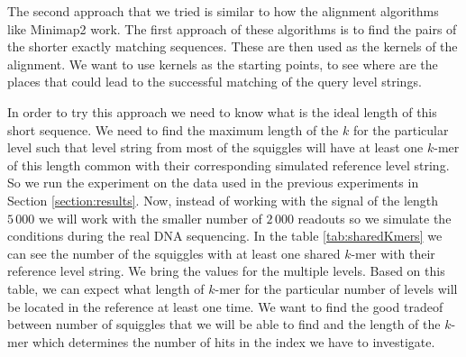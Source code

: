 The second approach that we tried is similar to how the alignment algorithms like
Minimap2 work. The first approach of these algorithms is to find the pairs of the shorter
exactly matching sequences. These are then used as the kernels of the alignment. We want
to use kernels as the starting points, to see where are the places that could lead to the
successful matching of the query level strings.

In order to try this approach we need to know what is the ideal length of this short
sequence. We need to find the maximum length of the $k$ for the particular level
such that level string from most of the squiggles will have at least one $k$-mer
of this length common with their corresponding simulated reference level string.
So we run the experiment on the data used in the previous experiments in Section
\ref{section:results}. Now, instead of working with the signal of the length
$5\,000$ we will work with the smaller number of $2\,000$ readouts so we
simulate the conditions during the real DNA sequencing. In the table \ref{tab:sharedKmers}
we can see the number of the squiggles with at least one shared $k$-mer with their reference
level string. We bring the values for the multiple levels. Based on this table,
we can expect what length of $k$-mer for the particular number of levels will be located
in the reference at least one time. We want to find the good tradeof between number of
squiggles that we will be able to find and the length of the $k$-mer which determines
the number of hits in the index we have to investigate.

